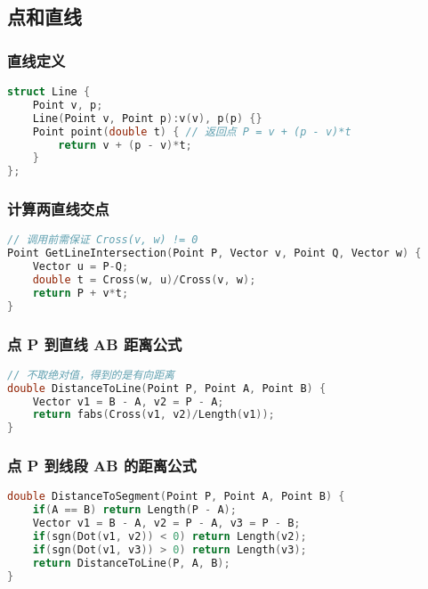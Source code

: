 \subsection{点和直线}

\subsubsection{直线定义}

\begin{lstlisting}[language=C++]
struct Line {
    Point v, p;
    Line(Point v, Point p):v(v), p(p) {}
    Point point(double t) { // 返回点 P = v + (p - v)*t
        return v + (p - v)*t;
    }
};
\end{lstlisting}

\subsubsection{计算两直线交点}

\begin{lstlisting}[language=C++]
// 调用前需保证 Cross(v, w) != 0
Point GetLineIntersection(Point P, Vector v, Point Q, Vector w) {
    Vector u = P-Q;
    double t = Cross(w, u)/Cross(v, w);
    return P + v*t;
}
\end{lstlisting}

\subsubsection{点 P 到直线 AB 距离公式}

\begin{lstlisting}[language=C++]
// 不取绝对值，得到的是有向距离
double DistanceToLine(Point P, Point A, Point B) {
    Vector v1 = B - A, v2 = P - A;
    return fabs(Cross(v1, v2)/Length(v1));
}
\end{lstlisting}

\subsubsection{点 P 到线段 AB 的距离公式}

\begin{lstlisting}[language=C++]
double DistanceToSegment(Point P, Point A, Point B) {
    if(A == B) return Length(P - A);
    Vector v1 = B - A, v2 = P - A, v3 = P - B;
    if(sgn(Dot(v1, v2)) < 0) return Length(v2);
    if(sgn(Dot(v1, v3)) > 0) return Length(v3);
    return DistanceToLine(P, A, B);
}
\end{lstlisting}


